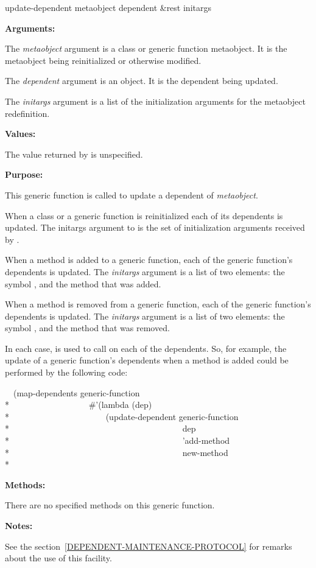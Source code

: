 \begin{defun}
update-dependent metaobject dependent &rest initargs

\textbf{Arguments:}

The \emph{metaobject} argument is a class or generic function metaobject. It is
the metaobject being reinitialized or otherwise modified.

The \emph{dependent} argument is an object. It is the dependent being updated.

The \emph{initargs} argument is a list of the initialization arguments for the
metaobject redefinition.

\textbf{Values:}

The value returned by  is unspecified.

\textbf{Purpose:}

This generic function is called to update a dependent of \emph{metaobject}.

When a class or a generic function is reinitialized each of its dependents is
updated. The initargs argument to  is the set of initialization
arguments received by .

When a method is added to a generic function, each of the generic function's
dependents is updated. The \emph{initargs} argument is a list of two elements: the
symbol , and the method that was added.

When a method is removed from a generic function, each of the generic function's
dependents is updated. The \emph{initargs} argument is a list of two elements: the
symbol , and the method that was removed.

In each case,  is used to call  on each of the
dependents. So, for example, the update of a generic function's dependents when
a method is added could be performed by the following code:

\begin{lisp}
~~(map-dependents generic-function \\*
~~~~~~~~~~~~~~~~~~\#'(lambda (dep) \\*
~~~~~~~~~~~~~~~~~~~~~~(update-dependent generic-function \\*
~~~~~~~~~~~~~~~~~~~~~~~~~~~~~~~~~~~~~~~~dep \\*
~~~~~~~~~~~~~~~~~~~~~~~~~~~~~~~~~~~~~~~~'add-method \\*
~~~~~~~~~~~~~~~~~~~~~~~~~~~~~~~~~~~~~~~~new-method \\*
\end{lisp}
                                      
\textbf{Methods:}

There are no specified methods on this generic function.

\textbf{Notes:}

See the section~\ref{DEPENDENT-MAINTENANCE-PROTOCOL} for remarks about the use
of this facility.
\end{defun}

